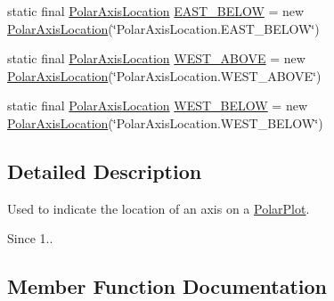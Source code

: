 \begin{DoxyCompactItemize}
\item 
static final \mbox{\hyperlink{classorg_1_1jfree_1_1chart_1_1plot_1_1_polar_axis_location}{Polar\+Axis\+Location}} \mbox{\hyperlink{classorg_1_1jfree_1_1chart_1_1plot_1_1_polar_axis_location_a6bf2adef67237704870107bb75c4bedd}{E\+A\+S\+T\+\_\+\+B\+E\+L\+OW}} = new \mbox{\hyperlink{classorg_1_1jfree_1_1chart_1_1plot_1_1_polar_axis_location}{Polar\+Axis\+Location}}(\char`\"{}Polar\+Axis\+Location.\+E\+A\+S\+T\+\_\+\+B\+E\+L\+OW\char`\"{})
\item 
static final \mbox{\hyperlink{classorg_1_1jfree_1_1chart_1_1plot_1_1_polar_axis_location}{Polar\+Axis\+Location}} \mbox{\hyperlink{classorg_1_1jfree_1_1chart_1_1plot_1_1_polar_axis_location_a2b25f323bfb6927eb00ddfa7f4c401f6}{W\+E\+S\+T\+\_\+\+A\+B\+O\+VE}} = new \mbox{\hyperlink{classorg_1_1jfree_1_1chart_1_1plot_1_1_polar_axis_location}{Polar\+Axis\+Location}}(\char`\"{}Polar\+Axis\+Location.\+W\+E\+S\+T\+\_\+\+A\+B\+O\+VE\char`\"{})
\item 
static final \mbox{\hyperlink{classorg_1_1jfree_1_1chart_1_1plot_1_1_polar_axis_location}{Polar\+Axis\+Location}} \mbox{\hyperlink{classorg_1_1jfree_1_1chart_1_1plot_1_1_polar_axis_location_a8506492e98d0c7c8b6680eb9c1b24907}{W\+E\+S\+T\+\_\+\+B\+E\+L\+OW}} = new \mbox{\hyperlink{classorg_1_1jfree_1_1chart_1_1plot_1_1_polar_axis_location}{Polar\+Axis\+Location}}(\char`\"{}Polar\+Axis\+Location.\+W\+E\+S\+T\+\_\+\+B\+E\+L\+OW\char`\"{})
\end{DoxyCompactItemize}


\subsection{Detailed Description}
Used to indicate the location of an axis on a \mbox{\hyperlink{classorg_1_1jfree_1_1chart_1_1plot_1_1_polar_plot}{Polar\+Plot}}.

\begin{DoxySince}{Since}
1.. 
\end{DoxySince}


\subsection{Member Function Documentation}
\mbox{\label{classorg_1_1jfree_1_1chart_1_1plot_1_1_polar_axis_location_a00715aadd4779d2a536040938cbd1154}} 
